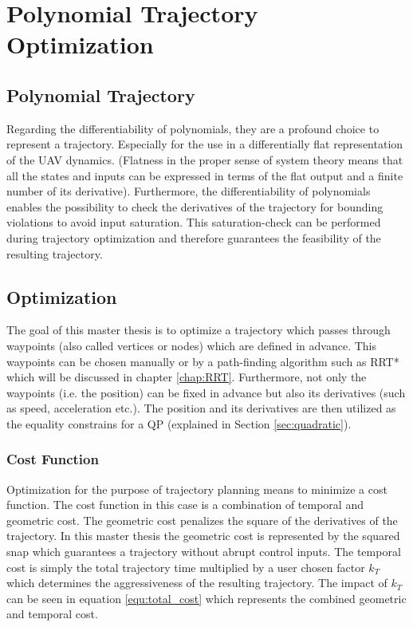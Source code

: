 \chapter{Polynomial Trajectory Optimization}\label{sec:trajectory}


\section{Polynomial Trajectory}\label{sec:polynomial}

Regarding the differentiability of polynomials, they are a profound choice to represent a trajectory. Especially for the use in a differentially flat representation of the UAV dynamics. (Flatness in the proper sense of system theory means that all the states and inputs can be expressed in terms of the flat output and a finite number of its derivative).
Furthermore, the differentiability of polynomials enables the possibility to check the derivatives of the trajectory for bounding violations to avoid input saturation. This saturation-check can be performed during trajectory optimization and therefore guarantees the feasibility of the resulting trajectory.

\section{Optimization}\label{sec:optimization}

The goal of this master thesis is to optimize a trajectory which passes through waypoints (also called vertices or nodes) which are defined in advance. This waypoints can be chosen manually or by a path-finding algorithm such as RRT* which will be discussed in chapter \ref{chap:RRT}.
Furthermore, not only the waypoints (i.e. the position) can be fixed in advance but also its derivatives (such as speed, acceleration etc.). The position and its derivatives are then utilized as the equality constrains for a QP (explained in Section \ref{sec:quadratic}).

\subsection{Cost Function}\label{sec:cost}

Optimization for the purpose of trajectory planning means to minimize a cost function. The cost function in this case is a combination of temporal and geometric cost. The geometric cost penalizes the square of the derivatives of the trajectory. In this master thesis the geometric cost is represented by the squared snap which guarantees a trajectory without abrupt  control inputs. \newline
The temporal cost is simply the total trajectory time multiplied by a user chosen factor $k_T$ which determines the aggressiveness of the resulting trajectory. The impact of  $k_T$  can be seen in equation \ref{equ:total_cost} which represents the combined geometric and temporal cost. \newline

